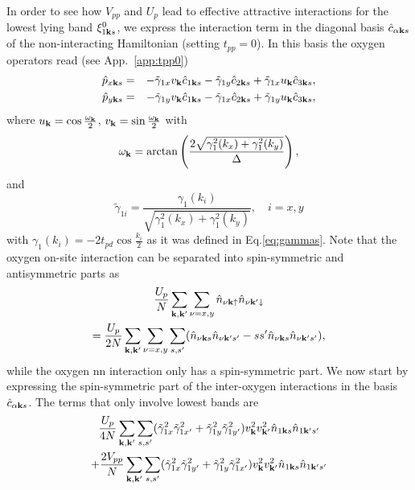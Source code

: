 \documentclass[prb, twocolumn,showpacs,preprintnumbers,amsmath,amssymb, floatfix]{revtex4}
\begin{document}
In order to see how $V_{pp}$ and $U_p$ lead to effective attractive
interactions for the lowest lying band $\xi_{1{\bf k}
  s}^{0}$,  we express the interaction term
in the diagonal basis $\hat{c}_{\alpha{\bf k} s}$ of the non-interacting Hamiltonian (setting $t_{pp} = 0$). 
In this basis
the oxygen operators read (see App.~\ref{app:tpp0})
\begin{eqnarray}
  \hat{p}_{x {\bf k} s} &=&   - \tilde{\gamma}_{1x}v_{{\bf k}}\hat{c}_{1{\bf k} s}-\tilde{\gamma}_{1y} \hat{c}_{2{\bf k} s} + \tilde{\gamma}_{1x}u_{{\bf k}}\hat{c}_{3{\bf k} s},\\
  \hat{p}_{y {\bf k} s} &=&  - \tilde{\gamma}_{1y}v_{{\bf k}}\hat{c}_{1{\bf k} s} -\tilde{\gamma}_{1x} \hat{c}_{2{\bf k} s}+ \tilde{\gamma}_{1y}u_{{\bf k}}\hat{c}_{3{\bf k} s},
  \label{eq:newbasis}
\end{eqnarray}
where $u_{{\bf k}}=\cos\frac{\omega_{{\bf k}}}2$, $v_{{\bf k}}=\sin\frac{\omega_{{\bf k}}}2$ with
\begin{equation}
  \omega_{{\bf k}} = \arctan\left(\frac{2\sqrt{\gamma_{1}^{2}(k_x) + \gamma_{1}^{2}(k_y)}}{\Delta}\right),
  \label{eq:omega}
\end{equation}
and 
\begin{equation}
  \tilde{\gamma}_{1i} =
  \frac{\gamma_{1}(k_{i})}{\sqrt{\gamma_{1}^2(k_x) +
      \gamma_{1}^{2}(k_y)}},\quad i=x,y
  \label{eq:gammatilde}
\end{equation}
with $\gamma_1 (k_{i})=-2t_{pd}\cos\frac{k_i}{2}$ as it was  defined in Eq.\eqref{eq:gammas}.
Note that the oxygen on-site interaction can be separated into spin-symmetric and antisymmetric parts as \begin{multline}
  \frac{U_{p}}{N} \sum_{{\bf k},{\bf k}'}\sum_{\nu = x, y}\hat{n}_{\nu{\bf k} \uparrow}\hat{n}_{\nu{\bf k}'\downarrow}\\
  = \frac{U_{p}}{2N} \sum_{{\bf k},{\bf k}'}\sum_{\nu = x, y}\sum_{s, s'}(\hat{n}_{\nu{\bf k} s}\hat{n}_{\nu{\bf k}' s'} - s s' \hat{n}_{\nu{\bf k} s}\hat{n}_{\nu{\bf k}' s'}),
  \label{eq:on-site2}
\end{multline}
while the oxygen nn interaction only has a spin-symmetric part.
We now start by expressing the 
spin-symmetric part of the inter-oxygen
interactions in the basis
$\hat{c}_{\alpha {\bf k}s}$. The terms that only involve lowest
bands are 
\begin{multline}
  \frac{U_{p}}{4N} \sum_{{\bf k},{\bf k}'}\sum_{s, s'}(\tilde{\gamma}_{1x}^2\tilde{\gamma}_{1x'}^2 + \tilde{\gamma}_{1y}^2\tilde{\gamma}_{1y'}^2)v_{{\bf k}}^2v_{{\bf k}'}^2 \hat{n}_{1{\bf k} s} \hat{n}_{1{\bf k}' s'}\\
  + \frac{2V_{pp}}{N} \sum_{{\bf k},{\bf k}'}\sum_{s, s'}(\tilde{\gamma}_{1x}^2\tilde{\gamma}_{1y'}^2 + \tilde{\gamma}_{1y}^2\tilde{\gamma}_{1x'}^2)v_{{\bf k}}^2v_{{\bf k}'}^2 \hat{n}_{1{\bf k} s} \hat{n}_{1{\bf k}' s'}
  \label{eq:both1}
\end{multline}
\end{document}
